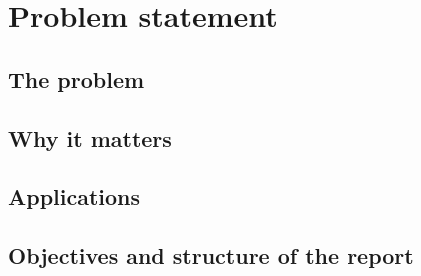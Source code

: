 \section{Problem statement}\label{sec:problem}

\subsection{The problem}

\subsection{Why it matters}

\subsection{Applications}

\subsection{Objectives and structure of the report}
